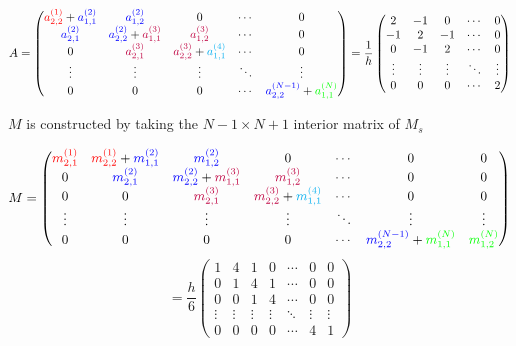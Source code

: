 \documentclass[12pt]{report}
\begin{document}
\[A = 
 \begin{pmatrix}
  \textcolor{red}{a^{(1)}_{2,2}}+\textcolor{blue}{a^{(2)}_{1,1}} & \textcolor{blue}{a^{(2)}_{1,2}} & 0 & \cdots & 0 \\
  \textcolor{blue}{a^{(2)}_{2,1}} & \textcolor{blue}{a^{(2)}_{2,2}}+\textcolor{purple}{a^{(3)}_{1,1}} & \textcolor{purple}{a^{(3)}_{1,2}} & \cdots & 0 \\
  0 & \textcolor{purple}{a^{(3)}_{2,1}} & \textcolor{purple}{a^{(3)}_{2,2}}+\textcolor{cyan}{a^{(4)}_{1,1}} & \cdots & 0 \\
   \vdots & \vdots & \vdots & \ddots & \vdots  \\
  0 & 0 & 0 & \cdots & \textcolor{blue}{a^{(N-1)}_{2,2}}+\textcolor{green}{a^{(N)}_{1,1}} 
 \end{pmatrix}
= \frac{1}{h}
 \begin{pmatrix}
  2 & -1 & 0 & \cdots & 0 \\
  -1 & 2 & -1 & \cdots & 0 \\
  0 & -1 & 2 & \cdots & 0\\
  \vdots  & \vdots & \vdots & \ddots & \vdots  \\
  0 & 0 & 0 & \cdots & 2 
 \end{pmatrix}
\]

$M$ is constructed by taking the $N-1\times{N}+1$ interior matrix of $M_s$

\[M = 
 \begin{pmatrix}
  \textcolor{red}{m^{(1)}_{2,1}} & \textcolor{red}{m^{(1)}_{2,2}}+\textcolor{blue}{m^{(2)}_{1,1}} & \textcolor{blue}{m^{(2)}_{1,2}} & 0 &\cdots & 0 & 0  \\
  0 & \textcolor{blue}{m^{(2)}_{2,1}} & \textcolor{blue}{m^{(2)}_{2,2}}+\textcolor{purple}{m^{(3)}_{1,1}} & \textcolor{purple}{m^{(3)}_{1,2}} & \cdots & 0 & 0 \\
  0 & 0 & \textcolor{purple}{m^{(3)}_{2,1}} & \textcolor{purple}{m^{(3)}_{2,2}}+\textcolor{cyan}{m^{(4)}_{1,1}} & \cdots & 0 & 0 \\
  \vdots  & \vdots & \vdots & \vdots & \ddots & \vdots & \vdots \\
  0 & 0 & 0 & 0 & \cdots & \textcolor{blue}{m^{(N-1)}_{2,2}}+\textcolor{green}{m^{(N)}_{1,1}} & \textcolor{green}{m^{(N)}_{1,2}}
 \end{pmatrix}
 \]
 \[
=\frac{h}{6}
 \begin{pmatrix}
  1 & 4 & 1 & 0 & \cdots  & 0 & 0 \\
  0 & 1 & 4 & 1 & \cdots  & 0 & 0 \\
  0 & 0 & 1 & 4 & \cdots  & 0 & 0 \\
  \vdots & \vdots & \vdots & \vdots & \ddots & \vdots  & \vdots \\
  0 & 0 & 0 & 0 & \cdots  & 4 & 1
 \end{pmatrix}
\]
\end{document}
